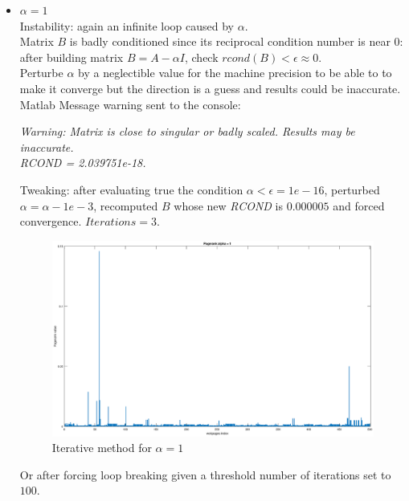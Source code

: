 \documentclass[unicode,11pt,a4paper,oneside,numbers=endperiod,openany]{scrartcl}
\begin{document}
\begin{itemize}
    \item $\alpha = 1$ \\
          Instability: again an infinite loop caused by $\alpha$. \\
          Matrix $B$ is badly conditioned since its reciprocal condition number is near $0$:
          after building matrix $B = A - \alpha I$, check $rcond(B) < \epsilon \approx 0$. \\
          Perturbe $\alpha$ by a neglectible value for the machine precision to be able to to make it converge
          but the direction is a guess and results could be inaccurate.
          Matlab Message warning sent to the console:

          \textit{Warning: Matrix is close to singular or badly scaled. Results may be inaccurate. \\
              RCOND =  2.039751e-18.}

          Tweaking: after evaluating true the condition $\alpha < \epsilon = 1e-16$,
          perturbed $\alpha = \alpha - 1e-3$, recomputed $B$ whose new \textit{RCOND} is $0.000005$
          and forced convergence.
          $Iterations = 3.$

          \begin{figure}[H]
              \centering
              \includegraphics[width=1\textwidth, trim={0 0 0 0}]{figures/ex4p3_a1.eps}
              \caption{Iterative method for $\alpha = 1$}
              \label{fig:e4p3_a1}
          \end{figure}

          Or after forcing loop breaking given a threshold number of iterations set to $100$.


\end{itemize}
\end{document}
